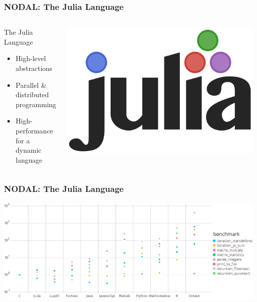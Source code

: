 \documentclass[10pt, compress, aspectratio=169]{beamer}
\begin{document}
\begin{frame}
    \frametitle{NODAL: The Julia Language}
    \begin{columns}[c]
        \begin{block}{The Julia Language}
            \begin{itemize}
                \item \alert{High-level abstractions}
                \item \alert{Parallel \& distributed} programming
                \item \alert{High-performance} for a dynamic language
            \end{itemize}
        \end{block}

        \begin{center}
            \includegraphics[width=.6\columnwidth]{julia}
        \end{center}

    \end{columns}
\end{frame}

\begin{frame}
    \frametitle{NODAL: The Julia Language}
    \begin{center}
        \includegraphics[width=.95\textwidth]{julia_benchmarks}
    \end{center}
\end{frame}
\end{document}
